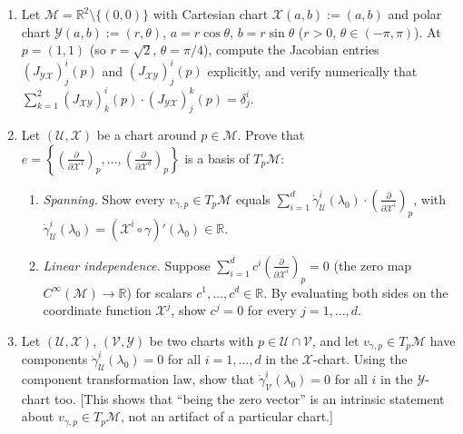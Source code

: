 \documentclass[11pt]{article}
\newcommand{\Cinf}{C^\infty(\mathcal M)}
\begin{document}
\begin{enumerate}[label=\textbf{4.\arabic*}, leftmargin=2.2cm, start=4]

\item \label{prob:jacobian-numeric}
Let $\mathcal M=\mathbb R^2\setminus\{(0,0)\}$ with Cartesian chart
$\mathcal X(a,b):=(a,b)$ and polar chart $\mathcal Y(a,b):=(r,\theta)$,
$a=r\cos\theta$, $b=r\sin\theta$ ($r>0$, $\theta\in(-\pi,\pi)$). At
$p=(1,1)$ (so $r=\sqrt2$, $\theta=\pi/4$), compute the Jacobian entries
$(J_{\mathcal{YX}})^i_j(p)$ and $(J_{\mathcal{XY}})^i_j(p)$ explicitly, and
verify numerically that $\sum_{k=1}^2 (J_{\mathcal{XY}})^i_k(p)\cdot
(J_{\mathcal{YX}})^k_j(p)=\delta^i_j$.

\item \label{prob:tangent-basis-is-basis}
Let $(\mathcal U,\mathcal X)$ be a chart around $p\in\mathcal M$. Prove that
$e=\left\{\left(\frac{\partial}{\partial\mathcal
X^1}\right)_p,\dots,\left(\frac{\partial}{\partial\mathcal
X^d}\right)_p\right\}$ is a basis of $T_p\mathcal M$:
\begin{enumerate}[label=(\alph*)]
  \item \emph{Spanning.} Show every $v_{\gamma,p}\in T_p\mathcal M$ equals
  $\sum_{i=1}^d \dot\gamma^i_{\mathcal U}(\lambda_0)\cdot\left(\frac{\partial}{\partial\mathcal X^i}\right)_p$, with $\dot\gamma^i_{\mathcal
  U}(\lambda_0)=(\mathcal X^i\circ\gamma)'(\lambda_0)\in\mathbb R$.
  \item \emph{Linear independence.} Suppose $\sum_{i=1}^d c^i
  \left(\frac{\partial}{\partial\mathcal X^i}\right)_p=0$ (the zero map
  $\Cinf\to\mathbb R$) for scalars $c^1,\dots,c^d\in\mathbb R$. By
  evaluating both sides on the coordinate function $\mathcal X^j$, show
  $c^j=0$ for every $j=1,\dots,d$.
\end{enumerate}

\item \label{prob:zero-vector-intrinsic}
Let $(\mathcal U,\mathcal X)$, $(\mathcal V,\mathcal Y)$ be two charts with
$p\in\mathcal U\cap\mathcal V$, and let $v_{\gamma,p}\in T_p\mathcal M$ have
components $\dot\gamma^i_{\mathcal U}(\lambda_0)=0$ for all $i=1,\dots,d$ in
the $\mathcal X$-chart. Using the component transformation law, show that
$\dot\gamma^i_{\mathcal V}(\lambda_0)=0$ for all $i$ in the $\mathcal
Y$-chart too. [This shows that ``being the zero vector'' is an intrinsic
statement about $v_{\gamma,p}\in T_p\mathcal M$, not an artifact of a
particular chart.]

\end{enumerate}
\end{document}

